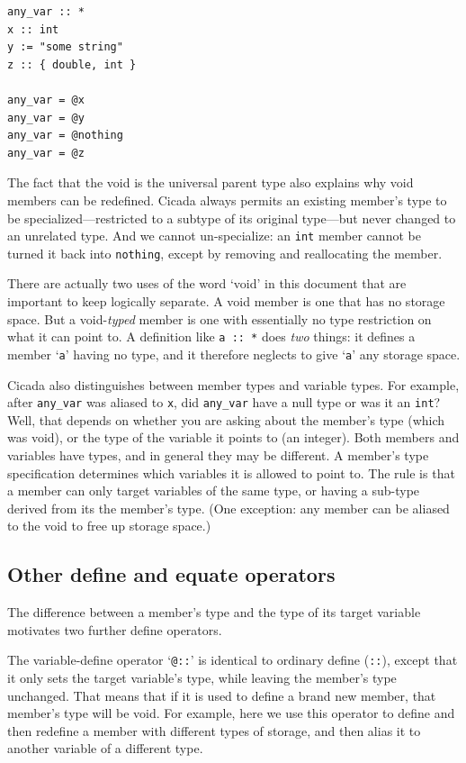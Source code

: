 \documentclass{article}
\newenvironment{code}{
       \begin{list}{}{
               \setlength{\leftmargin}{.4in}
               \setlength{\rightmargin}{0in}
               \setlength{\topsep}{.2in}
       }
       \small
       \item[] }
       { \end{list}   }
\begin{document}
\begin{code} \begin{verbatim}
any_var :: *
x :: int
y := "some string"
z :: { double, int }

any_var = @x
any_var = @y
any_var = @nothing
any_var = @z
\end{verbatim} \end{code}

The fact that the void is the universal parent type also explains why void members can be redefined.  Cicada always permits an existing member's type to be specialized---restricted to a subtype of its original type---but never changed to an unrelated type.  And we cannot un-specialize:  an \verb#int# member cannot be turned it back into \verb#nothing#, except by removing and reallocating the member.

There are actually two uses of the word `void' in this document that are important to keep logically separate.  A void member is one that has no storage space.  But a void-\emph{typed} member is one with essentially no type restriction on what it can point to.  A definition like \verb#a :: *# does \emph{two} things:  it defines a member `\verb#a#' having no type, and it therefore neglects to give `\verb#a#' any storage space.

Cicada also distinguishes between member types and variable types.  For example, after \texttt{any\_var} was aliased to \texttt{x}, did \texttt{any\_var} have a null type or was it an \verb#int#?  Well, that depends on whether you are asking about the member's type (which was void), or the type of the variable it points to (an integer).  Both members and variables have types, and in general they may be different.  A member's type specification determines which variables it is allowed to point to.  The rule is that a member can only target variables of the same type, or having a sub-type derived from its the member's type.  (One exception:  any member can be aliased to the void to free up storage space.)\\




\subsection{Other define and equate operators}

The difference between a member's type and the type of its target variable motivates two further define operators.

The variable-define operator `\texttt{@::}' is identical to ordinary define (\texttt{::}), except that it only sets the target variable's type, while leaving the member's type unchanged.  That means that if it is used to define a brand new member, that member's type will be void.  For example, here we use this operator to define and then redefine a member with different types of storage, and then alias it to another variable of a different type.
\end{document}
